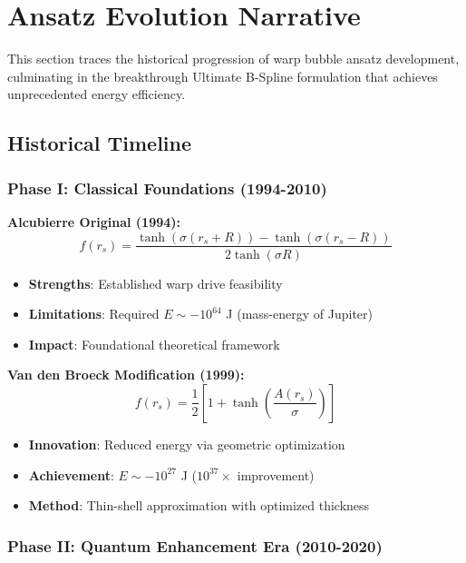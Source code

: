 \section{Ansatz Evolution Narrative}
\label{sec:ansatz_evolution}

This section traces the historical progression of warp bubble ansatz development, culminating in the breakthrough Ultimate B-Spline formulation that achieves unprecedented energy efficiency.

\subsection{Historical Timeline}

\subsubsection{Phase I: Classical Foundations (1994-2010)}

\textbf{Alcubierre Original (1994):}
\begin{equation}
f(r_s) = \frac{\tanh(\sigma(r_s + R)) - \tanh(\sigma(r_s - R))}{2\tanh(\sigma R)}
\end{equation}

\begin{itemize}
\item \textbf{Strengths}: Established warp drive feasibility
\item \textbf{Limitations}: Required $E \sim -10^{64}$ J (mass-energy of Jupiter)
\item \textbf{Impact}: Foundational theoretical framework
\end{itemize}

\textbf{Van den Broeck Modification (1999):}
\begin{equation}
f(r_s) = \frac{1}{2}\left[1 + \tanh\left(\frac{A(r_s)}{\sigma}\right)\right]
\end{equation}

\begin{itemize}
\item \textbf{Innovation}: Reduced energy via geometric optimization
\item \textbf{Achievement}: $E \sim -10^{27}$ J ($10^{37}\times$ improvement)
\item \textbf{Method}: Thin-shell approximation with optimized thickness
\end{itemize}

\subsubsection{Phase II: Quantum Enhancement Era (2010-2020)}

